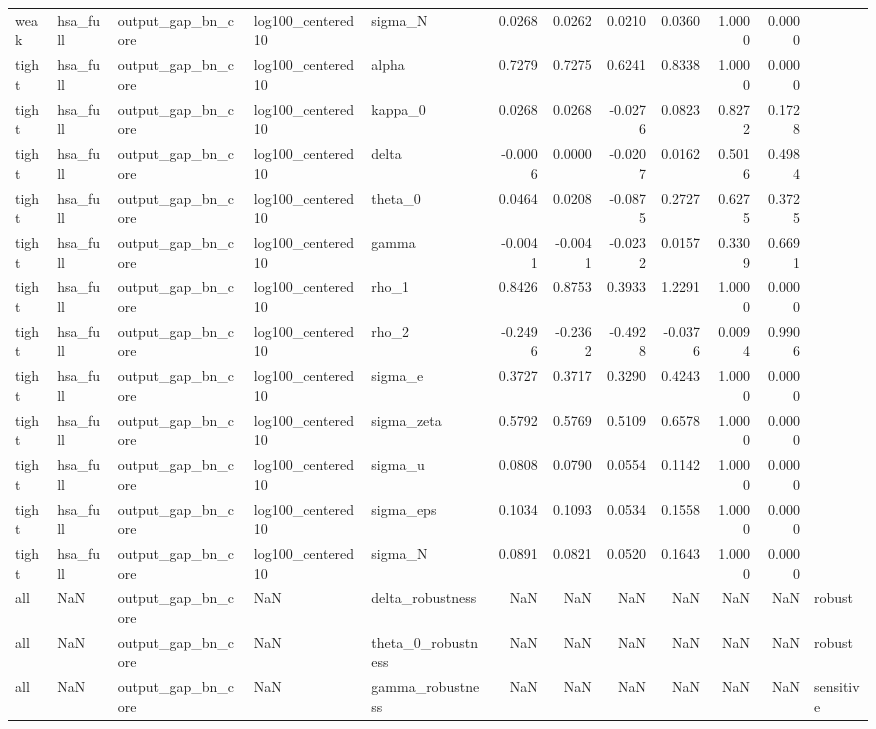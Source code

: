 \begin{tabular}{lllllrrrrrrl}
weak & hsa\_full & output\_gap\_bn\_core & log100\_centered10 & sigma\_N & 0.0268 & 0.0262 & 0.0210 & 0.0360 & 1.0000 & 0.0000 &  \\
tight & hsa\_full & output\_gap\_bn\_core & log100\_centered10 & alpha & 0.7279 & 0.7275 & 0.6241 & 0.8338 & 1.0000 & 0.0000 &  \\
tight & hsa\_full & output\_gap\_bn\_core & log100\_centered10 & kappa\_0 & 0.0268 & 0.0268 & -0.0276 & 0.0823 & 0.8272 & 0.1728 &  \\
tight & hsa\_full & output\_gap\_bn\_core & log100\_centered10 & delta & -0.0006 & 0.0000 & -0.0207 & 0.0162 & 0.5016 & 0.4984 &  \\
tight & hsa\_full & output\_gap\_bn\_core & log100\_centered10 & theta\_0 & 0.0464 & 0.0208 & -0.0875 & 0.2727 & 0.6275 & 0.3725 &  \\
tight & hsa\_full & output\_gap\_bn\_core & log100\_centered10 & gamma & -0.0041 & -0.0041 & -0.0232 & 0.0157 & 0.3309 & 0.6691 &  \\
tight & hsa\_full & output\_gap\_bn\_core & log100\_centered10 & rho\_1 & 0.8426 & 0.8753 & 0.3933 & 1.2291 & 1.0000 & 0.0000 &  \\
tight & hsa\_full & output\_gap\_bn\_core & log100\_centered10 & rho\_2 & -0.2496 & -0.2362 & -0.4928 & -0.0376 & 0.0094 & 0.9906 &  \\
tight & hsa\_full & output\_gap\_bn\_core & log100\_centered10 & sigma\_e & 0.3727 & 0.3717 & 0.3290 & 0.4243 & 1.0000 & 0.0000 &  \\
tight & hsa\_full & output\_gap\_bn\_core & log100\_centered10 & sigma\_zeta & 0.5792 & 0.5769 & 0.5109 & 0.6578 & 1.0000 & 0.0000 &  \\
tight & hsa\_full & output\_gap\_bn\_core & log100\_centered10 & sigma\_u & 0.0808 & 0.0790 & 0.0554 & 0.1142 & 1.0000 & 0.0000 &  \\
tight & hsa\_full & output\_gap\_bn\_core & log100\_centered10 & sigma\_eps & 0.1034 & 0.1093 & 0.0534 & 0.1558 & 1.0000 & 0.0000 &  \\
tight & hsa\_full & output\_gap\_bn\_core & log100\_centered10 & sigma\_N & 0.0891 & 0.0821 & 0.0520 & 0.1643 & 1.0000 & 0.0000 &  \\
all & NaN & output\_gap\_bn\_core & NaN & delta\_robustness & NaN & NaN & NaN & NaN & NaN & NaN & robust \\
all & NaN & output\_gap\_bn\_core & NaN & theta\_0\_robustness & NaN & NaN & NaN & NaN & NaN & NaN & robust \\
all & NaN & output\_gap\_bn\_core & NaN & gamma\_robustness & NaN & NaN & NaN & NaN & NaN & NaN & sensitive \\
\bottomrule
\end{tabular}
